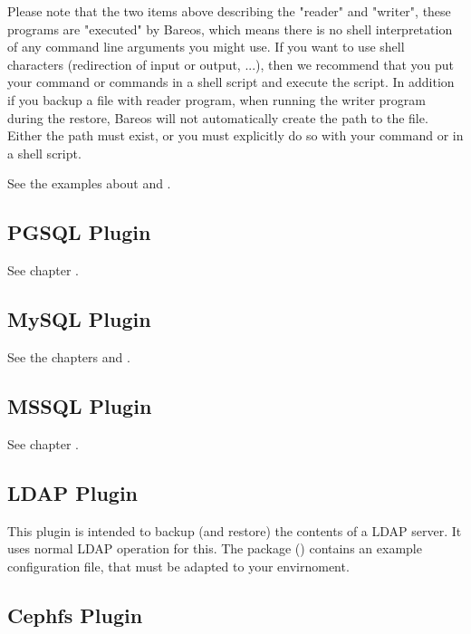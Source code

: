Please note that the two items above describing the "reader" and "writer", these programs are "executed" by Bareos, which means 
there is no shell interpretation of any command line arguments you might use. If you want to use shell characters (redirection of input 
or output, ...), then we recommend that you put your command or commands in a shell script and execute the script. In addition if you
backup a file with reader program, when running the writer program during the restore, Bareos will not automatically create the path
to the file. Either the path must exist, or you must explicitly do so with your command or in a shell script.

See the examples about  and .


\subsection{PGSQL Plugin}

See chapter .

\subsection{MySQL Plugin}

See the chapters  and .

\subsection{MSSQL Plugin}

See chapter .

\subsection{LDAP Plugin}

This plugin is intended to backup (and restore) the contents of a LDAP server.
It uses normal LDAP operation for this.
The package  () contains an example configuration file, that must be adapted to your envirnoment.

\subsection{Cephfs Plugin}

